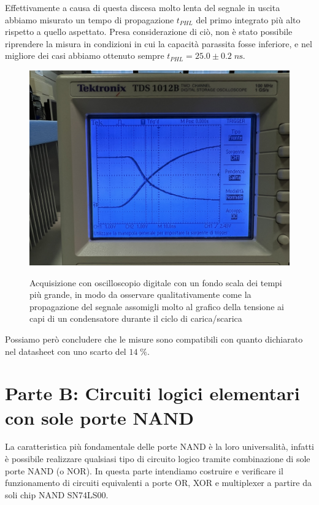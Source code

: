 \documentclass[10pt, a4paper, italian]{article}
\begin{document}
Effettivamente a causa di questa discesa molto lenta del segnale in uscita
abbiamo misurato un tempo di propagazione $t_{PHL}$ del primo integrato più alto rispetto a quello aspettato. Presa considerazione di ciò, non è stato possibile riprendere la misura in condizioni in cui la capacità parassita fosse inferiore, e nel migliore dei casi abbiamo ottenuto sempre $t_{PHL}=25.0 \pm 0.2 \; \si{n\s}$.
\begin{figure}[htbp]
\centering
	\includegraphics[width=\textwidth]{carica}
	\label{fig: carica}
	\caption{Acquisizione con oscilloscopio digitale con un fondo scala dei tempi più grande, in modo da osservare qualitativamente come la propagazione del segnale assomigli molto al grafico della tensione ai capi di un condensatore durante il ciclo di carica/scarica}
\end{figure}
Possiamo però concludere che le misure sono compatibili con quanto dichiarato nel datasheet con uno scarto del $14 \; \percent$.

\setcounter{section}{3}
\section*{Parte B: Circuiti logici elementari con sole porte NAND}
La caratteristica più fondamentale delle porte NAND è la loro universalità,
infatti è possibile realizzare qualsiasi tipo di circuito logico tramite
combinazione di sole porte NAND (o NOR). In questa parte intendiamo costruire
e verificare il funzionamento di circuiti equivalenti a porte OR, XOR e
multiplexer a partire da soli chip NAND SN74LS00.
\end{document}
